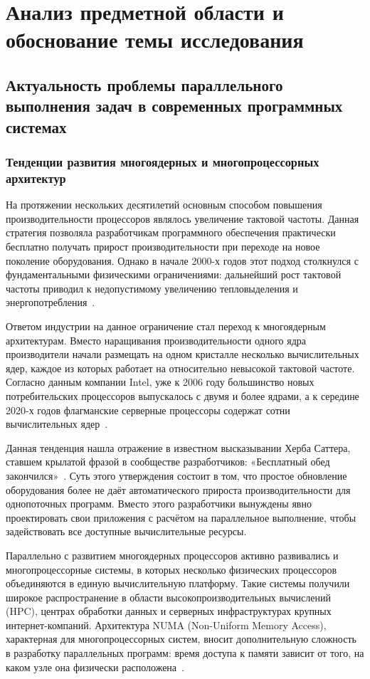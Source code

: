 \section{Анализ предметной области и обоснование темы исследования}

\subsection{Актуальность проблемы параллельного выполнения задач в современных программных системах}
\label{subsec:relevance-research}

\subsubsection{Тенденции развития многоядерных и многопроцессорных архитектур}

На протяжении нескольких десятилетий основным способом повышения производительности процессоров являлось увеличение тактовой частоты. Данная стратегия позволяла разработчикам программного обеспечения практически бесплатно получать прирост производительности при переходе на новое поколение оборудования. Однако в начале 2000-х годов этот подход столкнулся с фундаментальными физическими ограничениями: дальнейший рост тактовой частоты приводил к недопустимому увеличению тепловыделения и энергопотребления~\cite{Sutter2005}.

Ответом индустрии на данное ограничение стал переход к многоядерным архитектурам. Вместо наращивания производительности одного ядра производители начали размещать на одном кристалле несколько вычислительных ядер, каждое из которых работает на относительно невысокой тактовой частоте. Согласно данным компании Intel, уже к 2006 году большинство новых потребительских процессоров выпускалось с двумя и более ядрами, а к середине 2020-х годов флагманские серверные процессоры содержат сотни вычислительных ядер~\cite{IntelXeon2023}.

Данная тенденция нашла отражение в известном высказывании Херба Саттера, ставшем крылатой фразой в сообществе разработчиков: «Бесплатный обед закончился»~\cite{Sutter2005}. Суть этого утверждения состоит в том, что простое обновление оборудования более не даёт автоматического прироста производительности для однопоточных программ. Вместо этого разработчики вынуждены явно проектировать свои приложения с расчётом на параллельное выполнение, чтобы задействовать все доступные вычислительные ресурсы.

Параллельно с развитием многоядерных процессоров активно развивались и многопроцессорные системы, в которых несколько физических процессоров объединяются в единую вычислительную платформу. Такие системы получили широкое распространение в области высокопроизводительных вычислений (HPC), центрах обработки данных и серверных инфраструктурах крупных интернет-компаний. Архитектура NUMA (Non-Uniform Memory Access), характерная для многопроцессорных систем, вносит дополнительную сложность в разработку параллельных программ: время доступа к памяти зависит от того, на каком узле она физически расположена~\cite{Lameter2013}.

